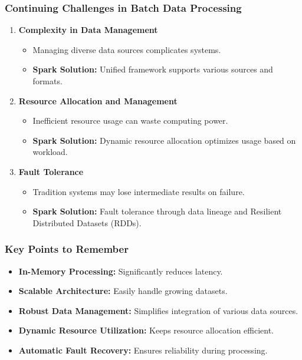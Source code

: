 \documentclass[aspectratio=169]{beamer}
\begin{document}
\begin{frame}
    \frametitle{Continuing Challenges in Batch Data Processing}
    \begin{enumerate}[resume]
        \item \textbf{Complexity in Data Management}
            \begin{itemize}
                \item Managing diverse data sources complicates systems.
                \item \textbf{Spark Solution:} Unified framework supports various sources and formats.
            \end{itemize}
        
        \item \textbf{Resource Allocation and Management}
            \begin{itemize}
                \item Inefficient resource usage can waste computing power.
                \item \textbf{Spark Solution:} Dynamic resource allocation optimizes usage based on workload.
            \end{itemize}
        
        \item \textbf{Fault Tolerance}
            \begin{itemize}
                \item Tradition systems may lose intermediate results on failure.
                \item \textbf{Spark Solution:} Fault tolerance through data lineage and Resilient Distributed Datasets (RDDs).
            \end{itemize}
    \end{enumerate}
\end{frame}

\begin{frame}
    \frametitle{Key Points to Remember}
    \begin{itemize}
        \item \textbf{In-Memory Processing:} Significantly reduces latency.
        \item \textbf{Scalable Architecture:} Easily handle growing datasets.
        \item \textbf{Robust Data Management:} Simplifies integration of various data sources.
        \item \textbf{Dynamic Resource Utilization:} Keeps resource allocation efficient.
        \item \textbf{Automatic Fault Recovery:} Ensures reliability during processing.
    \end{itemize}
\end{frame}
\end{document}
